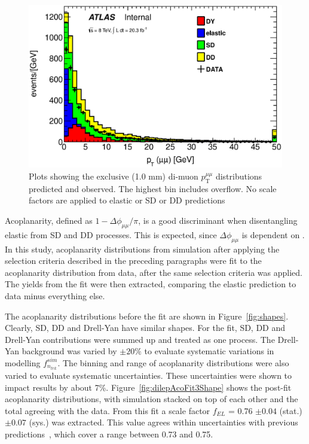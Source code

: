 \begin{figure}
\centering
\includegraphics[width=0.8\linewidth]{figures/ptmumuL.eps}
\caption{Plots showing the exclusive (1.0 mm) di-muon $p_{\mathrm{T}}^{\mu\mu}$ distributions predicted and observed. The
  highest bin includes overflow. No scale factors are applied to
  elastic or SD or DD predictions}
\label{fig:ptL}
\end{figure}

\par Acoplanarity, defined as $1-\Delta\phi_{\mu\mu}/\pi$, is a good discriminant when disentangling elastic 
from SD and DD processes. This is expected, since $\Delta\phi_{\mu\mu}$ is dependent on \pTmumu. In this study, 
acoplanarity distributions from simulation after applying the selection criteria described in the preceding paragraphs   
were fit to the acoplanarity distribution from data, after the same selection criteria was applied. 
The yields from the fit were then extracted, comparing the elastic prediction to data minus everything else. 

\par The acoplanarity distributions before the fit are shown in Figure~\ref{fig:shapes}. Clearly, SD, DD and 
Drell-Yan have similar shapes. For the fit, SD, DD and Drell-Yan contributions were summed up and treated as 
one process. The Drell-Yan background was varied by $\pm20\%$ to evaluate systematic variations in modelling 
$f^{sim}_{n_{trk}}$. The binning and range of acoplanarity distributions were also varied to evaluate 
systematic uncertainties. These uncertainties were shown to impact results by about 7\%. 
Figure~\ref{fig:dilepAcoFit3Shape} shows the post-fit acoplanarity distributions, with 
simulation stacked on top of each other and the total agreeing with the data. From this fit a scale factor 
 $f_{EL}$ = 0.76 $\pm0.04$ (stat.) $\pm0.07$ (sys.) was extracted. This value agrees within uncertainties with 
previous predictions~\cite{Dyndal}, which cover a range between 0.73 and 0.75.   

